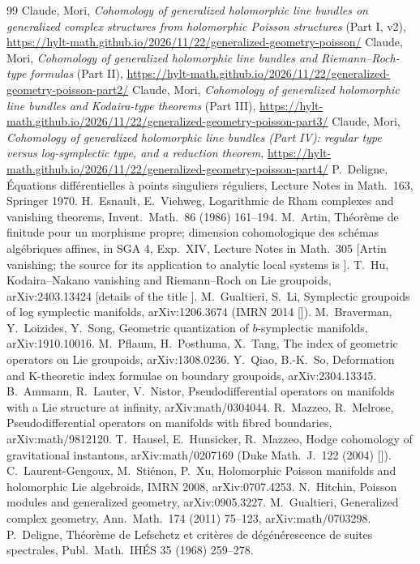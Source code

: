 \begin{thebibliography}{99}\small
{} Claude, Mori, \emph{Cohomology of generalized holomorphic line bundles on generalized complex structures from holomorphic Poisson structures} (Part I, v2), \url{https://hylt-math.github.io/2026/11/22/generalized-geometry-poisson/}
 Claude, Mori, \emph{Cohomology of generalized holomorphic line bundles and Riemann--Roch-type formulas} (Part II), \url{https://hylt-math.github.io/2026/11/22/generalized-geometry-poisson-part2/}
 Claude, Mori, \emph{Cohomology of generalized holomorphic line bundles and Kodaira-type theorems} (Part III), \url{https://hylt-math.github.io/2026/11/22/generalized-geometry-poisson-part3/}
 Claude, Mori, \emph{Cohomology of generalized holomorphic line bundles (Part IV): regular type versus log-symplectic type, and a reduction theorem}, \url{https://hylt-math.github.io/2026/11/22/generalized-geometry-poisson-part4/}
 P.\ Deligne, \'Equations diff\'erentielles \`a points singuliers r\'eguliers, Lecture Notes in Math.\ 163, Springer 1970.
 H.\ Esnault, E.\ Viehweg, Logarithmic de Rham complexes and vanishing theorems, Invent.\ Math.\ 86 (1986) 161--194.
 M.\ Artin, Th\'eor\`eme de finitude pour un morphisme propre; dimension cohomologique des sch\'emas alg\'ebriques affines, in SGA 4, Exp.\ XIV, Lecture Notes in Math.\ 305 [Artin vanishing; the source for its application to analytic local systems is \tQ].
 T.\ Hu, Kodaira--Nakano vanishing and Riemann--Roch on Lie groupoids, arXiv:2403.13424 [details of the title \tQ].
 M.\ Gualtieri, S.\ Li, Symplectic groupoids of log symplectic manifolds, arXiv:1206.3674 (IMRN 2014 [\tQ]).
 M.\ Braverman, Y.\ Loizides, Y.\ Song, Geometric quantization of $b$-symplectic manifolds, arXiv:1910.10016.
 M.\ Pflaum, H.\ Posthuma, X.\ Tang, The index of geometric operators on Lie groupoids, arXiv:1308.0236.
 Y.\ Qiao, B.-K.\ So, Deformation and K-theoretic index formulae on boundary groupoids, arXiv:2304.13345.
 B.\ Ammann, R.\ Lauter, V.\ Nistor, Pseudodifferential operators on manifolds with a Lie structure at infinity, arXiv:math/0304044.
 R.\ Mazzeo, R.\ Melrose, Pseudodifferential operators on manifolds with fibred boundaries, arXiv:math/9812120.
 T.\ Hausel, E.\ Hunsicker, R.\ Mazzeo, Hodge cohomology of gravitational instantons, arXiv:math/0207169 (Duke Math.\ J.\ 122 (2004) [\tQ]).
 C.\ Laurent-Gengoux, M.\ Sti\'enon, P.\ Xu, Holomorphic Poisson manifolds and holomorphic Lie algebroids, IMRN 2008, arXiv:0707.4253.
 N.\ Hitchin, Poisson modules and generalized geometry, arXiv:0905.3227.
 M.\ Gualtieri, Generalized complex geometry, Ann.\ Math.\ 174 (2011) 75--123, arXiv:math/0703298.
 P.\ Deligne, Th\'eor\`eme de Lefschetz et crit\`eres de d\'eg\'en\'erescence de suites spectrales, Publ.\ Math.\ IH\'ES 35 (1968) 259--278.
\end{thebibliography}

